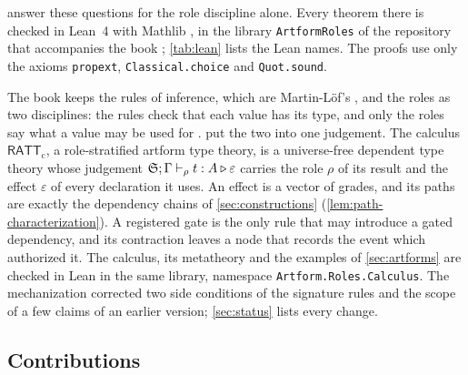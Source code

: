 \documentclass[11pt]{article}
\numberwithin{equation}{section}
\theoremstyle{definition}
\theoremstyle{plain}
\theoremstyle{remark}
\newcommand{\RATT}{\mathsf{RATT}_{\mathrm c}}
\newcommand{\eps}{\varepsilon}
\begin{document}
 answer these
questions for the role discipline alone.  Every theorem there is checked in
Lean~4 with Mathlib \cite{Lean4,Mathlib}, in the library \texttt{ArtformRoles}
of the repository that accompanies the book \cite{Repo}; \cref{tab:lean} lists
the Lean names.  The proofs use only the axioms \texttt{propext},
\texttt{Classical.choice} and \texttt{Quot.sound}.

The book keeps the rules of inference, which are Martin-L\"of's
\cite{MartinLof}, and the roles as two disciplines: the rules check that each
value has its type, and only the roles say what a value may be used for
\cite[\S1.11]{Book}.  
put the two into one judgement.  The calculus \(\RATT\), a role-stratified
artform type theory, is a universe-free dependent type theory whose
judgement
\(\AFDeclSignature;\Gamma\vdash_{\rho}t:A\triangleright\eps\) carries the role
\(\rho\) of its result and the effect \(\eps\) of every declaration it uses.
An effect is a vector of grades, and its paths are exactly the dependency
chains of \cref{sec:constructions} (\cref{lem:path-characterization}).  A
registered gate is the only rule that may introduce a gated dependency, and
its contraction leaves a node that records the event which authorized it.
The calculus, its metatheory and the examples of \cref{sec:artforms} are
checked in Lean in the same library, namespace
\texttt{Artform.Roles.Calculus}.  The mechanization corrected two side
conditions of the signature rules and the scope of a few claims of an earlier
version; \cref{sec:status} lists every change.

\subsection{Contributions}
\end{document}
